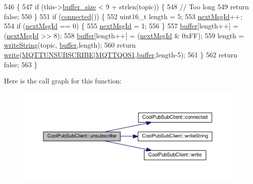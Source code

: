 \begin{DoxyCode}
546                                                        \{
547     \textcolor{keywordflow}{if} (this->\hyperlink{class_cool_pub_sub_client_ae6cb10e42c057483d53516ac830ab526}{buffer\_size} < 9 + strlen(topic)) \{
548         \textcolor{comment}{// Too long}
549         \textcolor{keywordflow}{return} \textcolor{keyword}{false};
550     \}
551     \textcolor{keywordflow}{if} (\hyperlink{class_cool_pub_sub_client_a3d5a5da4ddb1e5c1bea64d80c665d148}{connected}()) \{
552         uint16\_t length = 5;
553         \hyperlink{class_cool_pub_sub_client_af248fa4e54e878e2fece2891eb98d262}{nextMsgId}++;
554         \textcolor{keywordflow}{if} (\hyperlink{class_cool_pub_sub_client_af248fa4e54e878e2fece2891eb98d262}{nextMsgId} == 0) \{
555             \hyperlink{class_cool_pub_sub_client_af248fa4e54e878e2fece2891eb98d262}{nextMsgId} = 1;
556         \}
557         \hyperlink{class_cool_pub_sub_client_a7e8bcc6096626916046a51bebadc7851}{buffer}[length++] = (\hyperlink{class_cool_pub_sub_client_af248fa4e54e878e2fece2891eb98d262}{nextMsgId} >> 8);
558         \hyperlink{class_cool_pub_sub_client_a7e8bcc6096626916046a51bebadc7851}{buffer}[length++] = (\hyperlink{class_cool_pub_sub_client_af248fa4e54e878e2fece2891eb98d262}{nextMsgId} & 0xFF);
559         length = \hyperlink{class_cool_pub_sub_client_a0e3d7e776d4cf4427f9569b28868905a}{writeString}(topic, \hyperlink{class_cool_pub_sub_client_a7e8bcc6096626916046a51bebadc7851}{buffer},length);
560         \textcolor{keywordflow}{return} \hyperlink{class_cool_pub_sub_client_a7a8e4854a1846eaa668046d3854d47ad}{write}(\hyperlink{_cool_pub_sub_client_8h_a23699f4f798fdb9d0fdaca83843c9634}{MQTTUNSUBSCRIBE}|\hyperlink{_cool_pub_sub_client_8h_a2365b1c4755e7dc1136c3f02488d1d41}{MQTTQOS1},\hyperlink{class_cool_pub_sub_client_a7e8bcc6096626916046a51bebadc7851}{buffer},length-5);
561     \}
562     \textcolor{keywordflow}{return} \textcolor{keyword}{false};
563 \}
\end{DoxyCode}
Here is the call graph for this function\+:\nopagebreak
\begin{figure}[H]
\begin{center}
\leavevmode
\includegraphics[width=350pt]{d8/d4b/class_cool_pub_sub_client_a850554280e314d6b5c33c73fd9e809fc_cgraph}
\end{center}
\end{figure}
\mbox{\label{class_cool_pub_sub_client_a7a8e4854a1846eaa668046d3854d47ad}} 
